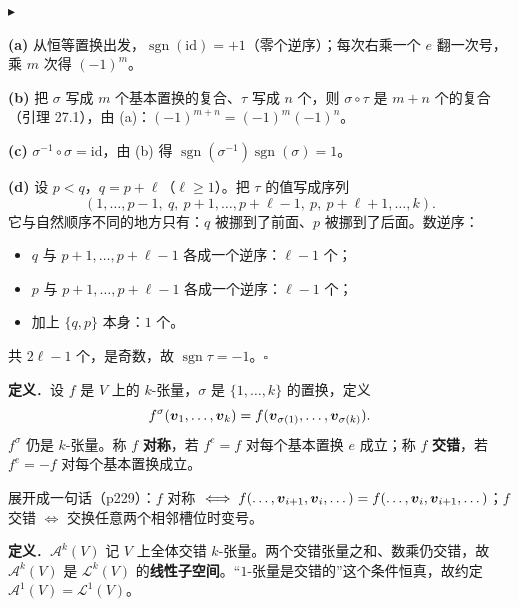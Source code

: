 \documentclass[11pt]{ctexart}
\newcommand{\step}[1]{\par\vspace{3pt}\noindent
  {\color{violet}\small$\blacktriangleright$}\hspace{3pt}{\bfseries\color{violetdeep}#1}\par\vspace{1pt}}
\newcommand{\Lk}{\mathcal{L}}
\newcommand{\Ak}{\mathcal{A}}
\newcommand{\sgn}{\operatorname{sgn}}
\begin{document}
\step{第二步：四条的证明}
\textbf{(a)} 从恒等置换出发，$\sgn(\mathrm{id})=+1$（零个逆序）；每次右乘一个 $e$ 翻一次号，乘 $m$ 次得 $(-1)^m$。

\textbf{(b)} 把 $\sigma$ 写成 $m$ 个基本置换的复合、$\tau$ 写成 $n$ 个，则 $\sigma\circ\tau$ 是 $m+n$ 个的复合（引理 27.1），由 (a)：$(-1)^{m+n}=(-1)^m(-1)^n$。

\textbf{(c)} $\sigma^{-1}\circ\sigma=\mathrm{id}$，由 (b) 得 $\sgn(\sigma^{-1})\sgn(\sigma)=1$。

\textbf{(d)} 设 $p<q$，$q=p+\ell$（$\ell\ge1$）。把 $\tau$ 的值写成序列
\[ (1,\dots,p-1,\ \boxed{q},\ p+1,\dots,p+\ell-1,\ \boxed{p},\ p+\ell+1,\dots,k). \]
它与自然顺序不同的地方只有：$q$ 被挪到了前面、$p$ 被挪到了后面。数逆序：
\begin{itemize}
  \item $q$ 与 $p+1,\dots,p+\ell-1$ 各成一个逆序：$\ell-1$ 个；
  \item $p$ 与 $p+1,\dots,p+\ell-1$ 各成一个逆序：$\ell-1$ 个；
  \item 加上 $\{q,p\}$ 本身：$1$ 个。
\end{itemize}
共 $2\ell-1$ 个，是奇数，故 $\sgn\tau=-1$。$\square$




\begin{notecall}
\textbf{定义}．设 $f$ 是 $V$ 上的 $k$-张量，$\sigma$ 是 $\{1,\dots,k\}$ 的置换，定义
\[ f^\sigma(\boldsymbol{v}_1,\dots,\boldsymbol{v}_k)=f(\boldsymbol{v}_{\sigma(1)},\dots,\boldsymbol{v}_{\sigma(k)}). \]
$f^\sigma$ 仍是 $k$-张量。称 $f$ \textbf{对称}，若 $f^{e}=f$ 对每个基本置换 $e$ 成立；称 $f$ \textbf{交错}，若 $f^{e}=-f$ 对每个基本置换成立。
\end{notecall}

展开成一句话（p229）：$f$ 对称 $\iff f(\dots,\boldsymbol{v}_{i+1},\boldsymbol{v}_i,\dots)=f(\dots,\boldsymbol{v}_i,\boldsymbol{v}_{i+1},\dots)$；$f$ 交错 $\iff$ 交换任意两个相邻槽位时变号。

\begin{notecall}
\textbf{定义}．$\Ak^k(V)$ 记 $V$ 上全体交错 $k$-张量。两个交错张量之和、数乘仍交错，故 $\Ak^k(V)$ 是 $\Lk^k(V)$ 的\textbf{线性子空间}。“$1$-张量是交错的”这个条件恒真，故约定 $\Ak^1(V)=\Lk^1(V)$。
\end{notecall}
\end{document}
